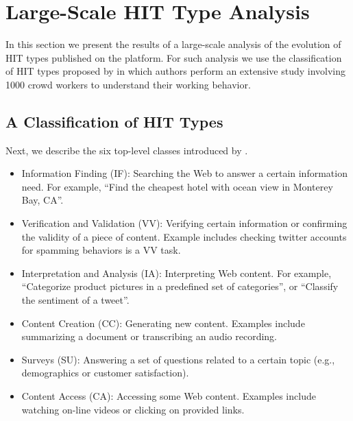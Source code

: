 \section{Large-Scale HIT Type Analysis}\label{sec:type}
In this section we present the results of a large-scale analysis of the evolution of HIT types published on the \amt{} platform.
For such analysis we use the classification of HIT types proposed by \cite{Gadiraju:2014:TMW:2631775.2631819} in which authors perform an extensive study involving 1000 crowd workers to understand their working behavior. 

\subsection{A Classification of HIT Types}
Next, we describe the six top-level classes introduced by \cite{Gadiraju:2014:TMW:2631775.2631819}.

\begin{itemize}

	\item Information Finding (IF): Searching the Web to answer a certain information need. For example, ``Find the cheapest hotel with ocean view in Monterey Bay, CA''.
	
	\item Verification and Validation (VV): Verifying certain information or confirming the validity of a piece of content. Example includes checking twitter accounts for spamming behaviors is a VV task.

	\item Interpretation and Analysis (IA): Interpreting Web content. For example, ``Categorize product pictures in a predefined set of categories'', or ``Classify the sentiment of a tweet''.
	
	\item Content Creation (CC): Generating new content. Examples include summarizing a document  or transcribing an audio recording.

	\item Surveys (SU): Answering a set of questions related to a certain topic (e.g., demographics or customer satisfaction). 
	
	\item Content Access (CA): Accessing some Web content. Examples include watching on-line videos or clicking on provided links.

\end{itemize}

